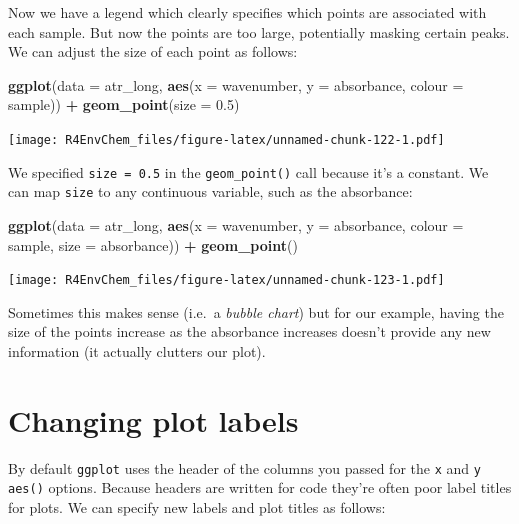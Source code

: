 \documentclass[
]{book}
\newenvironment{Shaded}{\begin{snugshade}}{\end{snugshade}}
\newcommand{\AttributeTok}[1]{\textcolor[rgb]{0.13,0.29,0.53}{#1}}
\newcommand{\FloatTok}[1]{\textcolor[rgb]{0.00,0.00,0.81}{#1}}
\newcommand{\FunctionTok}[1]{\textcolor[rgb]{0.13,0.29,0.53}{\textbf{#1}}}
\newcommand{\NormalTok}[1]{#1}
\newcommand{\SpecialCharTok}[1]{\textcolor[rgb]{0.81,0.36,0.00}{\textbf{#1}}}
\begin{document}
Now we have a legend which clearly specifies which points are associated with each sample. But now the points are too large, potentially masking certain peaks. We can adjust the size of each point as follows:

\begin{Shaded}
\begin{Highlighting}[]
\FunctionTok{ggplot}\NormalTok{(}\AttributeTok{data =}\NormalTok{ atr\_long, }
       \FunctionTok{aes}\NormalTok{(}\AttributeTok{x =}\NormalTok{ wavenumber, }
           \AttributeTok{y =}\NormalTok{ absorbance, }
           \AttributeTok{colour =}\NormalTok{ sample)) }\SpecialCharTok{+}
  \FunctionTok{geom\_point}\NormalTok{(}\AttributeTok{size =} \FloatTok{0.5}\NormalTok{)}
\end{Highlighting}
\end{Shaded}

\texttt{[image: R4EnvChem\_files/figure-latex/unnamed-chunk-122-1.pdf]}

We specified \texttt{size\ =\ 0.5} in the \texttt{geom\_point()} call because it's a constant. We can map \texttt{size} to any continuous variable, such as the absorbance:

\begin{Shaded}
\begin{Highlighting}[]
\FunctionTok{ggplot}\NormalTok{(}\AttributeTok{data =}\NormalTok{ atr\_long, }
       \FunctionTok{aes}\NormalTok{(}\AttributeTok{x =}\NormalTok{ wavenumber, }
           \AttributeTok{y =}\NormalTok{ absorbance, }
           \AttributeTok{colour =}\NormalTok{ sample,}
           \AttributeTok{size =}\NormalTok{ absorbance)) }\SpecialCharTok{+}
  \FunctionTok{geom\_point}\NormalTok{()}
\end{Highlighting}
\end{Shaded}

\texttt{[image: R4EnvChem\_files/figure-latex/unnamed-chunk-123-1.pdf]}

Sometimes this makes sense (i.e.~a \emph{bubble chart}) but for our example, having the size of the points increase as the absorbance increases doesn't provide any new information (it actually clutters our plot).

\hypertarget{changing-plot-labels}{%
\section{Changing plot labels}\label{changing-plot-labels}}

By default \texttt{ggplot} uses the header of the columns you passed for the \texttt{x} and \texttt{y} \texttt{aes()} options. Because headers are written for code they're often poor label titles for plots. We can specify new labels and plot titles as follows:
\end{document}
